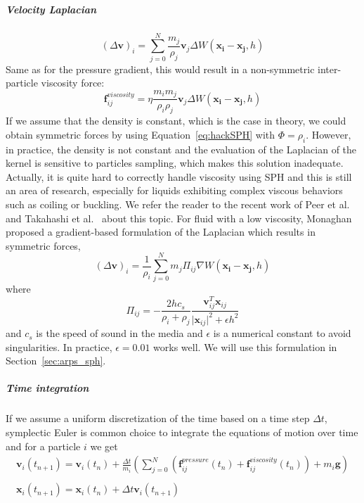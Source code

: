 \subparagraph{Velocity Laplacian}
\begin{equation}
\left(\Delta \mathbf{v}\right)_{i} = \sum_{j=0}^{N} \frac{m_{j}}{\rho_{j}} \mathbf{v}_{j} \Delta W(\mathbf{x_{i}}-\mathbf{x_{j}},h)
\end{equation}
Same as for the pressure gradient, this would result in a non-symmetric inter-particle viscosity force:
\begin{equation}
\label{eq:nonSymmetricViscosityForce}
\mathbf{f}^{viscosity}_{ij} = \eta\frac{m_{i}m_{j}}{\rho_{i}\rho_{j}}\mathbf{v}_{j}\Delta W(\mathbf{x_{i}}-\mathbf{x_{j}},h)
\end{equation}
If we assume that the density is constant, which is the case in theory, we could obtain symmetric forces by using Equation~\eqref{eq:hackSPH} with $\Phi=\rho_{i}$. However, in practice, the density is not constant and the evaluation of the Laplacian of the kernel is sensitive to particles sampling, which makes this solution inadequate.
Actually, it is quite hard to correctly handle viscosity using SPH and this is still an area of research, especially for liquids exhibiting complex viscous behaviors such as coiling or buckling.
We refer the reader to the recent work of Peer et al.~\cite{Peer2015} and Takahashi et al.~\cite{Takahashi2015} about this topic.
For fluid with a low viscosity, Monaghan~\cite{Monaghan2005} proposed a gradient-based formulation of the Laplacian which results in symmetric forces,
\begin{equation}
\label{eq:velocityLaplacianSPH}
\left(\Delta \mathbf{v}\right)_{i} = 
\frac{1}{\rho_{i}}
\sum_{j=0}^{N} m_{j} \Pi_{ij} \nabla W(\mathbf{x_{i}}-\mathbf{x_{j}},h)
\end{equation}
where 
\begin{equation}
    \Pi_{ij} = -\frac{2hc_{s}}{\rho_{i}+\rho_{j}}\frac{\mathbf{v}_{ij}^{T}\mathbf{x}_{ij}}{\vert \mathbf{x}_{ij} \vert^{2} + \epsilon h^{2}}
\end{equation}
and $c_{s}$ is the speed of sound in the media and $\epsilon$ is a numerical constant to avoid singularities.
In practice, $\epsilon=0.01$ works well. We will use this formulation in Section~\ref{sec:arps_sph}.
\subparagraph{Time integration} If we assume a uniform discretization of the time based on a time step $\Delta t$, symplectic Euler is common choice to integrate the equations of motion over time and for a particle $i$ we get
\begin{equation}
\begin{array}{ll}
\displaystyle \mathbf{v}_{i}(t_{n+1}) = \mathbf{v}_{i}(t_{n}) + \frac{\Delta t}{m_{i}}\left( \sum_{j=0}^{N}\left(\mathbf{f}_{ij}^{pressure}(t_{n})+\mathbf{f}_{ij}^{viscosity}(t_{n})\right)+m_{i}\mathbf{g}\right) \\ \\
\displaystyle \mathbf{x}_{i}(t_{n+1}) = \mathbf{x}_{i}(t_{n}) + \Delta t \mathbf{v}_{i}(t_{n+1})
\end{array}
\end{equation}

